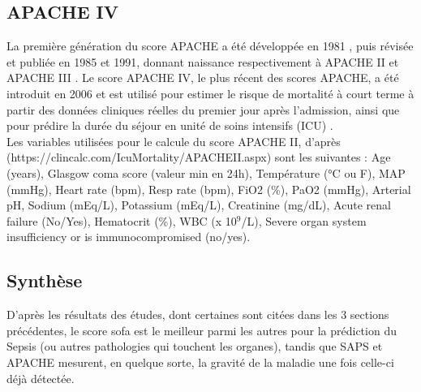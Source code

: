\documentclass[a4paper,12pt]{article}
\begin{document}
\subsection{APACHE IV \cite{zimmerman2006acute}}
La première génération du score APACHE a été développée en 1981 \cite{wa1981apache}, puis révisée et publiée en 1985 et 1991, donnant naissance respectivement à APACHE II et APACHE III \cite{knaus1985apache} \cite{knaus1991apache}. Le score APACHE IV, le plus récent des scores APACHE, a été introduit en 2006 \cite{zimmerman2006acute} et est utilisé pour estimer le risque de mortalité à court terme à partir des données cliniques réelles du premier jour après l'admission, ainsi que pour prédire la durée du séjour en unité de soins intensifs (ICU) \cite{zimmerman2006intensive}.\\
Les variables utilisées pour le calcule du score APACHE II, d'après (https://clincalc.com/IcuMortality/APACHEII.aspx) sont les suivantes : Age (years), Glasgow coma score (valeur min en 24h), Température (°C ou F), MAP (mmHg), Heart rate (bpm), Resp rate (bpm), FiO2 (\%), PaO2 (mmHg), Arterial pH, Sodium (mEq/L), Potassium (mEq/L), Creatinine (mg/dL), Acute renal failure (No/Yes), Hematocrit (\%), WBC (x 10\(^9\)/L), Severe organ system insufficiency or is immunocompromised (no/yes).
		 				
\subsection*{Synthèse}
D'après les résultats des études, dont certaines sont citées dans les 3 sections précédentes, le score sofa est le meilleur parmi les autres pour la prédiction du Sepsis (ou autres pathologies qui touchent les organes), tandis que SAPS et APACHE mesurent, en quelque sorte, la gravité de la maladie une fois celle-ci déjà détectée.

\renewcommand{\arraystretch}{1.5} %
\end{document}
